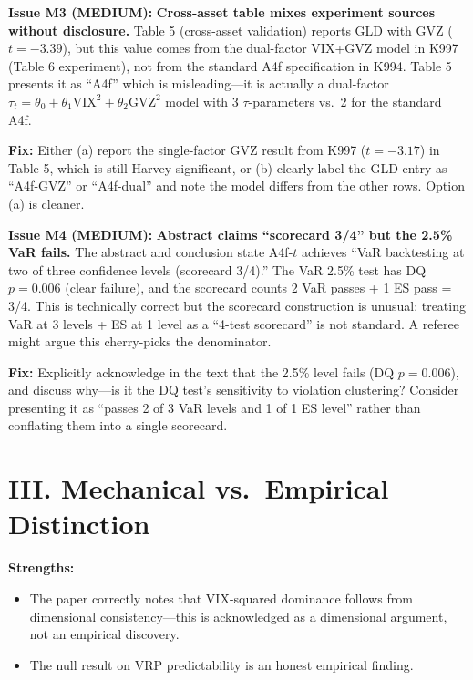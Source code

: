 \documentclass[12pt,a4paper]{article}
\begin{document}
\bigskip

\textcolor{warncolor}{\textbf{Issue M3 (MEDIUM):}} \textbf{Cross-asset table mixes experiment sources without disclosure.} Table 5 (cross-asset validation) reports GLD with GVZ ($t = -3.39$), but this value comes from the dual-factor VIX+GVZ model in K997 (Table 6 experiment), not from the standard A4f specification in K994. Table 5 presents it as ``A4f'' which is misleading---it is actually a dual-factor $\tau_t = \theta_0 + \theta_1 \mathrm{VIX}^2 + \theta_2 \mathrm{GVZ}^2$ model with 3 $\tau$-parameters vs.\ 2 for the standard A4f.

\textbf{Fix:} Either (a) report the single-factor GVZ result from K997 ($t = -3.17$) in Table 5, which is still Harvey-significant, or (b) clearly label the GLD entry as ``A4f-GVZ'' or ``A4f-dual'' and note the model differs from the other rows. Option (a) is cleaner.

\bigskip

\textcolor{warncolor}{\textbf{Issue M4 (MEDIUM):}} \textbf{Abstract claims ``scorecard 3/4'' but the 2.5\% VaR fails.} The abstract and conclusion state A4f-$t$ achieves ``VaR backtesting at two of three confidence levels (scorecard 3/4).'' The VaR 2.5\% test has DQ $p = 0.006$ (clear failure), and the scorecard counts 2 VaR passes + 1 ES pass = 3/4. This is technically correct but the scorecard construction is unusual: treating VaR at 3 levels + ES at 1 level as a ``4-test scorecard'' is not standard. A referee might argue this cherry-picks the denominator.

\textbf{Fix:} Explicitly acknowledge in the text that the 2.5\% level fails (DQ $p = 0.006$), and discuss why---is it the DQ test's sensitivity to violation clustering? Consider presenting it as ``passes 2 of 3 VaR levels and 1 of 1 ES level'' rather than conflating them into a single scorecard.


\section*{III. Mechanical vs.\ Empirical Distinction}

\textcolor{okgreen}{\textbf{Strengths:}}
\begin{itemize}
\item The paper correctly notes that VIX-squared dominance follows from dimensional consistency---this is acknowledged as a dimensional argument, not an empirical discovery.
\item The null result on VRP predictability is an honest empirical finding.
\end{itemize}
\end{document}
